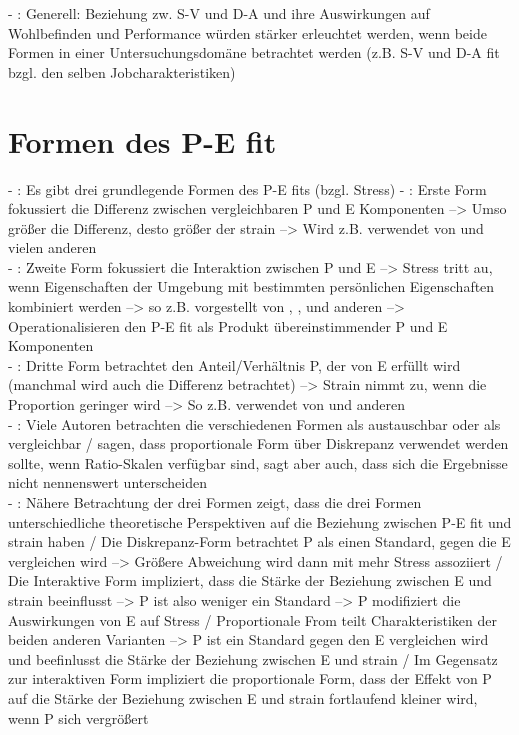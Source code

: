 - \cite[S. 5]{edwards:1990}: Generell: Beziehung zw. S-V und D-A und ihre Auswirkungen auf Wohlbefinden und Performance würden stärker erleuchtet werden, wenn beide Formen in einer Untersuchungsdomäne betrachtet werden (z.B. S-V und D-A fit bzgl. den selben Jobcharakteristiken) \textcite{caplan:1987}

\section{Formen des P-E fit}
\label{ch:notizen:formen}
- \cite[S. 5]{edwards:1990}: Es gibt drei grundlegende Formen des P-E fits (bzgl. Stress)
- \cite[S. 5]{edwards:1990}: Erste Form fokussiert die Differenz zwischen vergleichbaren P und E Komponenten --> Umso größer die Differenz, desto größer der strain --> Wird z.B. verwendet von \textcite{mechanismsOfJobStressAndStrain:1982} und vielen anderen \\
- \cite[S. 5]{edwards:1990}: Zweite Form fokussiert die Interaktion zwischen P und E --> Stress tritt au, wenn Eigenschaften der Umgebung mit bestimmten persönlichen Eigenschaften kombiniert werden --> so z.B. vorgestellt von \textcite{cherringtonEngland:1980}, \textcite{lyons:1971}, \textcite{obrien:1980} und anderen --> Operationalisieren den P-E fit als Produkt übereinstimmender P und E Komponenten \\
- \cite[S. 5]{edwards:1990}: Dritte Form betrachtet den Anteil/Verhältnis P, der von E erfüllt wird (manchmal wird auch die Differenz betrachtet) --> Strain nimmt zu, wenn die Proportion geringer wird --> So z.B. verwendet von \textcite{mechanismsOfJobStressAndStrain:1982} und anderen \\
- \cite[S. 5]{edwards:1990}: Viele Autoren betrachten die verschiedenen Formen als austauschbar oder als vergleichbar /  \textcite{mechanismsOfJobStressAndStrain:1982} sagen, dass proportionale Form über Diskrepanz verwendet werden sollte, wenn Ratio-Skalen verfügbar sind, sagt aber auch, dass sich die Ergebnisse nicht nennenswert unterscheiden \\
- \cite[S. 5]{edwards:1990}: Nähere Betrachtung der drei Formen zeigt, dass die drei Formen unterschiedliche theoretische Perspektiven auf die Beziehung zwischen P-E fit und strain haben / Die Diskrepanz-Form betrachtet P als einen Standard, gegen die E vergleichen wird --> Größere Abweichung wird dann mit mehr Stress assoziiert / Die Interaktive Form impliziert, dass die Stärke der Beziehung zwischen E und strain beeinflusst --> P ist also weniger ein Standard --> P modifiziert die Auswirkungen von E auf Stress / Proportionale From teilt Charakteristiken der beiden anderen Varianten --> P ist ein Standard gegen den E vergleichen wird und beefinlusst die Stärke der Beziehung zwischen E und strain / Im Gegensatz zur interaktiven Form impliziert die proportionale Form, dass der Effekt von P auf die Stärke der Beziehung zwischen E und strain fortlaufend kleiner wird, wenn P sich vergrößert \\
